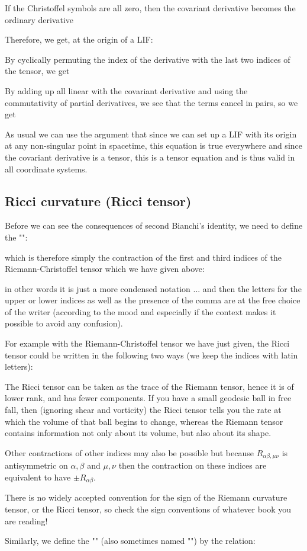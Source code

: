 	If the Christoffel symbols are all zero, then the covariant derivative becomes the ordinary derivative
	
	Therefore, we get, at the origin of a LIF:
	
	By cyclically permuting the index of the derivative with the last two indices of the tensor, we get
	
	By adding up all linear with the covariant derivative and using the commutativity of partial derivatives, we see that the terms cancel in pairs, so we get
	
	As usual we can use the argument that since we can set up a LIF with its origin at any non-singular point in spacetime, this equation is true everywhere and since the covariant derivative is a tensor, this is a tensor equation and is thus valid in all coordinate systems.
	
	
	\subsection{Ricci curvature (Ricci tensor)}\label{Ricci tensor}
	Before we can see the consequences of second Bianchi's identity, we need to define the "":
	
	which is therefore simply the contraction of the first and third indices of the Riemann-Christoffel tensor which we have given above:
	
	in other words it is just a more condensed notation ... and then the letters for the upper or lower indices as well as the presence of the comma are at the free choice of the writer (according to the mood and especially if the context makes it possible to avoid any confusion).

	For example with the Riemann-Christoffel tensor we have just given, the Ricci tensor could be written in the following two ways (we keep the indices with latin letters):
	
	The Ricci tensor can be taken as the trace of the Riemann tensor, hence it is of lower rank, and has fewer components. If you have a small geodesic ball in free fall, then (ignoring shear and vorticity) the Ricci tensor tells you the rate at which the volume of that ball begins to change, whereas the Riemann tensor contains information not only about its volume, but also about its shape. 
	
	Other contractions of other indices may also be possible but because $R_{\alpha\beta,\mu\nu}$ is antisymmetric on $\alpha,\beta$ and $\mu,\nu$ then the contraction on these indices are equivalent to have $\pm R_{\alpha\beta}$.
	\begin{tcolorbox}[title=Remark,colframe=black,arc=10pt]
	There is no widely accepted convention for the sign of the Riemann
curvature tensor, or the Ricci tensor, so check the sign conventions of whatever book you are reading!
	\end{tcolorbox}
	Similarly, we define the "\label{ricci scalar}" (also sometimes named "") by the relation:
	
